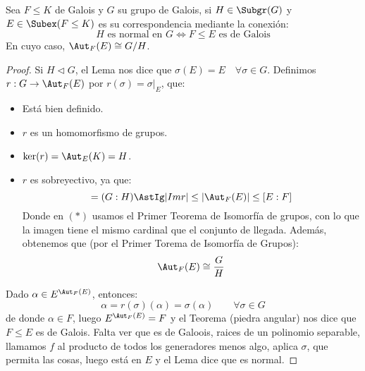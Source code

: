 \begin{teo}
    Sea $F\leq K$ de Galois y $G$ su grupo de Galois, si $H\in \Subgr(G)$ y $E\in \Subex(F\leq K)$ es su correspondencia mediante la conexión:
    \begin{equation*}
        H \text{\ es normal en\ } G \Longleftrightarrow F\leq E \text{\ es de Galois}
    \end{equation*}
    En cuyo caso, $\Aut_F(E)\cong G/H$.
    \begin{proof}
        Si $H\lhd G$, el Lema nos dice que $\sigma(E) = E\quad \forall \sigma\in G$. Definimos $r:G\to \Aut_F(E)$ por $r(\sigma) = \sigma\big|_{E}$, que:
        \begin{itemize}
            \item Está bien definido.
            \item $r$ es un homomorfismo de grupos.
            \item $\ker(r) = \Aut_E(K)  = H$.
            \item $r$ es sobreyectivo, ya que:
                \begin{equation*}
                    [E:F] = (G:H) \AstIg |Im r|\leq |\Aut_F(E)| \leq [E:F]
                \end{equation*}
                Donde en $(\ast)$ usamos el Primer Teorema de Isomorfía de grupos, con lo que la imagen tiene el mismo cardinal que el conjunto de llegada. Además, obtenemos que (por el Primer Torema de Isomorfía de Grupos):
                \begin{equation*}
                    \Aut_F(E) \cong \dfrac{G}{H}
                \end{equation*}
        \end{itemize}
        Dado $\alpha \in E^{\Aut_F(E)}$, entonces: 
        \begin{equation*}
            \alpha = r(\sigma)(\alpha) = \sigma(\alpha) \qquad \forall \sigma\in G
        \end{equation*}
        de donde $\alpha\in F$, luego $E^{\Aut_F(E)} = F$ y el Teorema (piedra angular) nos dice que $F\leq E$ es de Galois. %
        Falta ver que es de Galoois, raices de un polinomio separable, llamamos $f$ al producto de todos los generadores menos algo, aplica $\sigma$, que permita las cosas, luego está en $E$ y el Lema dice que es normal.
    \end{proof}
\end{teo}

